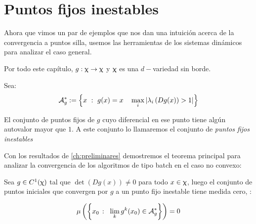 \section{Puntos fijos inestables}

Ahora que vimos un par de ejemplos que nos dan una intuici\'on acerca de la convergencia a puntos silla, usemos las herramientas de los sistemas din\'amicos para analizar el caso general.

Por todo este cap\'itulo, $g: \upchi \rightarrow \upchi$ y $\upchi$ es una $d-$variedad sin borde.

\begin{definition}
	Sea:
	\begin{equation*}
	\label{def:punto fijo inestable de g}
	\mathcal{A}_{g}^{*} := \left\lbrace x \ : \ g(x) = x \quad \max\limits_{i}\left\lvert\lambda_i \left(Dg(x)\right) > 1\right\rvert\right\rbrace
	\end{equation*}
	
	El conjunto de puntos fijos de $g$ cuyo diferencial en ese punto tiene alg\'un autovalor mayor que $1$. A este conjunto lo llamaremos el conjunto de \textit{puntos fijos inestables}
	
\end{definition}

Con los resultados de \ref{ch:preliminares} demostremos el teorema principal para analizar la convergencia de los algoritmos de tipo batch en el caso no convexo:

\begin{theorem}
	\label{teo: Principal}
	Sea $g \in C^1(\upchi)$ tal que $\det\left(Dg(x)\right) \neq 0$ para todo $x \in \upchi$, luego el conjunto de puntos iniciales que convergen por $g$ a un punto fijo inestable tiene medida cero, \ie:
	
	\begin{equation*}
	\mu \left(\sett{x_0 \ \colon \ \Biglim{k}{g^k(x_0) \in \mathcal{A}_g^{*}}}\right) = 0
	\end{equation*}
\end{theorem}

